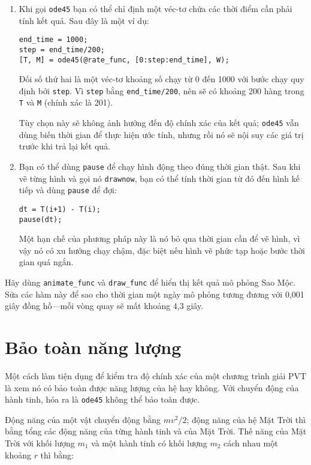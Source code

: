 \documentclass[12pt]{book}
\begin{document}
\begin{enumerate}

\item Khi gọi {\tt ode45} bạn có thể chỉ định một véc-tơ chứa các thời điểm
cần phải tính kết quả. Sau đây là một ví dụ:

\begin{verbatim}
end_time = 1000;
step = end_time/200;
[T, M] = ode45(@rate_func, [0:step:end_time], W);
\end{verbatim}
%
Đối số thứ hai là một véc-tơ khoảng số chạy từ 0 đến 1000 với bước chạy
quy định bởi {\tt step}.  Vì {\tt step} bằng \verb#end_time/200#, nên
sẽ có khoảng 200 hàng trong {\tt T} và {\tt M} (chính xác là 201).

Tùy chọn này sẽ không ảnh hưởng đến độ chính xác của kết quả; 
{\tt ode45} vẫn dùng biến thời gian để thực hiện ước tính, nhưng rồi
nó sẽ nội suy các giá trị trước khi trả lại kết quả.

\item Bạn có thể dùng {\tt pause} để chạy hình động theo đúng thời
gian thật. Sau khi vẽ từng hình và gọi nó {\tt drawnow}, bạn có thể
tính thời gian từ đó đến hình kế tiếp và dùng {\tt pause} để đợi:

\begin{verbatim}
dt = T(i+1) - T(i);
pause(dt);
\end{verbatim}
%
Một hạn chế của phương pháp này là nó bỏ qua thời gian cần để
vẽ hình, vì vậy nó có xu hướng chạy chậm, đặc biệt nếu hình vẽ 
phức tạp hoặc bước thời gian quá ngắn.

\end{enumerate}

\begin{ex}
Hãy dùng \verb#animate_func# và \verb#draw_func# để hiển thị
kết quả mô phỏng Sao Mộc. Sửa các hàm này để sao cho thời gian
một ngày mô phỏng tương đương với 0,001 giây đồng hồ---mỗi
vòng quay sẽ mất khoảng 4,3 giây.
\end{ex}


\section{Bảo toàn năng lượng}

Một cách làm tiện dụng để kiểm tra độ chính xác của một chương trình
giải PVT là xem nó có bảo toàn được năng lượng của hệ hay không.
Với chuyển động của hành tinh, hóa ra là {\tt ode45} không thể
bảo toàn được.

Động năng của một vật chuyển động bằng $m v^2 / 2$; động năng
của hệ Mặt Trời thì bằng tổng các động năng của từng hành tinh và của 
Mặt Trời. Thế năng của Mặt Trời với khối lượng $m_1$ và một hành tinh
có khối lượng $m_2$ cách nhau một khoảng $r$ thì bằng:
\end{document}
